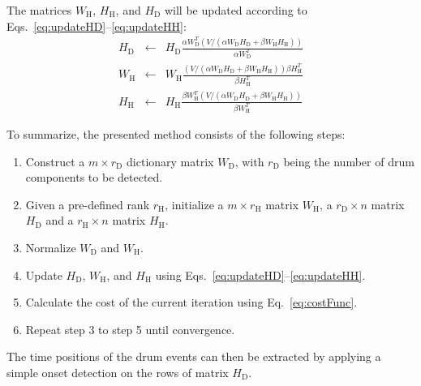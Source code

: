 \documentclass{article}
\begin{document}
The matrices  $W_\mathrm{H}$, $H_\mathrm{H}$, and $H_\mathrm{D}$ will be updated according to \mbox{Eqs.~\eqref{eq:updateHD}--\eqref{eq:updateHH}}: 
%
\begin{eqnarray}
\label{eq:updateHD}
H_\mathrm{D} &\leftarrow& H_\mathrm{D}\frac{\alpha W_\mathrm{D}^T( V / (\alpha W_\mathrm{D}H_\mathrm{D} + \beta W_\mathrm{H}H_\mathrm{H}))}{\alpha W_\mathrm{D}^T}\\
%
\label{eq:updateWH}
W_\mathrm{H} &\leftarrow& W_\mathrm{H}\frac{(V/(\alpha W_\mathrm{D}H_\mathrm{D} + \beta W_\mathrm{H}H_\mathrm{H})) \beta H_\mathrm{H}^T}{\beta H_\mathrm{H}^T}\\
%
\label{eq:updateHH}
H_\mathrm{H} &\leftarrow& H_\mathrm{H}\frac{\beta W_\mathrm{H}^T (V/(\alpha W_\mathrm{D}H_\mathrm{D} + \beta W_\mathrm{H}H_\mathrm{H}))}{\beta W_\mathrm{H}^T}
\end{eqnarray}

To summarize, the presented method consists of the following steps:
\begin{enumerate}
    \item   Construct a $m \times r_\mathrm{D}$ dictionary matrix $W_\mathrm{D}$, with $r_\mathrm{D}$ being the number of drum components to be detected.
    \item   Given a pre-defined rank $r_\mathrm{H}$, initialize a $m \times r_\mathrm{H}$ matrix $W_\mathrm{H}$, a $r_\mathrm{D} \times n$ matrix $H_\mathrm{D}$ and a $r_\mathrm{H} \times n$ matrix $H_\mathrm{H}$.
    \item   Normalize $W_\mathrm{D}$ and $W_\mathrm{H}$. 
    \item   Update $H_\mathrm{D}$, $W_\mathrm{H}$, and $H_\mathrm{H}$ using Eqs.~\eqref{eq:updateHD}--\eqref{eq:updateHH}.
    \item   Calculate the cost of the current iteration using Eq.~\eqref{eq:costFunc}.
    \item   Repeat step 3 to step 5 until convergence.
\end{enumerate}
%
The time positions of the drum events can then be extracted by applying a simple onset detection on the rows of matrix $H_\mathrm{D}$.
\end{document}
